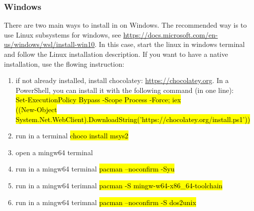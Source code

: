 \documentclass{book}
\begin{document}
\subsubsection{Windows}
There are two main ways to install in on Windows. The recommended way is to use Linux subsystems for windows, see \url{https://docs.microsoft.com/en-us/windows/wsl/install-win10}. In this case, start the linux in windows terminal and follow the Linux installation description. If you want to have a native installation, use the flowing instruction: 
\begin{enumerate}
    \item if not already installed, install chocolatey: \url{https://chocolatey.org}. In a PowerShell, you can install it with the following command (in one line): \\ \hl{Set-ExecutionPolicy Bypass -Scope Process -Force; iex \\ ((New-Object System.Net.WebClient).DownloadString('https://chocolatey.org/install.ps1'))}
    \item run in a terminal \hl{choco install msys2}
    \item open a mingw64 terminal
    \item run in a mingw64 terminal \hl{pacman --noconfirm -Syu}
    \item run in a mingw64 terimnal \hl{pacman -S mingw-w64-x86\_64-toolchain}
    \item run in a mingw64 terimnal \hl{pacman --noconfirm -S dos2unix}
\end{enumerate}
\end{document}
